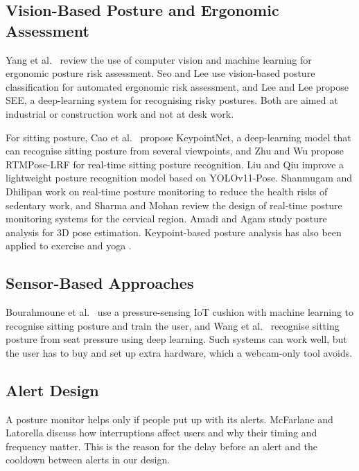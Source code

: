 ﻿\documentclass[12pt,a4paper]{article}
\begin{document}
\subsection{Vision-Based Posture and Ergonomic Assessment}
Yang et al.\ \cite{yang2024review} review the use of computer vision and machine learning
for ergonomic posture risk assessment. Seo and Lee \cite{seo2021automated} use
vision-based posture classification for automated ergonomic risk assessment, and Lee and
Lee \cite{lee2022see} propose SEE, a deep-learning system for recognising risky postures.
Both are aimed at industrial or construction work and not at desk work.

For sitting posture, Cao et al.\ \cite{cao2025keypointnet} propose KeypointNet, a
deep-learning model that can recognise sitting posture from several viewpoints, and Zhu and
Wu \cite{zhu2025rtmposelrf} propose RTMPose-LRF for real-time sitting posture
recognition. Liu and Qiu \cite{liu2025yolov11} improve a lightweight posture recognition
model based on YOLOv11-Pose. Shanmugam and Dhilipan \cite{shanmugam2025sedentary} work on
real-time posture monitoring to reduce the health risks of sedentary work, and Sharma and
Mohan \cite{sharma2025cervical} review the design of real-time posture monitoring systems
for the cervical region. Amadi and Agam \cite{amadi2023postureposE} study posture analysis
for 3D pose estimation. Keypoint-based posture analysis has also been applied to exercise
\cite{supanich2023mediapipe} and yoga \cite{gamra2022yopose}.

\subsection{Sensor-Based Approaches}
Bourahmoune et al.\ \cite{bourahmoune2022cushion} use a pressure-sensing IoT cushion with
machine learning to recognise sitting posture and train the user, and Wang et al.\
\cite{wang2025pressure} recognise sitting posture from seat pressure using deep learning.
Such systems can work well, but the user has to buy and set up extra hardware, which a
webcam-only tool avoids.

\subsection{Alert Design}
A posture monitor helps only if people put up with its alerts. McFarlane and Latorella
\cite{mcfarlane2002scope} discuss how interruptions affect users and why their timing and
frequency matter. This is the reason for the delay before an alert and the cooldown
between alerts in our design.
\end{document}
